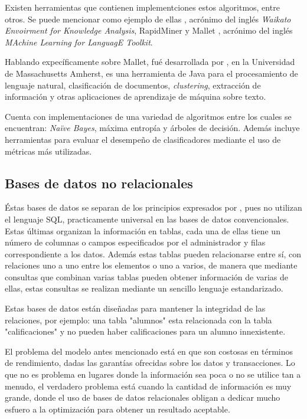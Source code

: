 Existen herramientas que contienen implementciones estos algoritmos, entre otros. Se puede mencionar como ejemplo de ellas \cite{Weka}, acrónimo del inglés \textit{Waikato Envoirment for Knowledge Analysis}, RapidMiner \cite{RapidMiner} y Mallet \cite{Mallet}, acrónimo del inglés \textit{MAchine Learning for LanguagE Toolkit}.

Hablando expecíficamente sobre Mallet, fué desarrollada por \cite{Mallet}, en la Universidad de Massachusetts Amherst, es una herramienta de Java para el procesamiento de lenguaje natural, clasificación de documentos, \textit{clustering}, extracción de información y otras aplicaciones de aprendizaje de máquina sobre texto.

Cuenta con implementaciones de una variedad de algoritmos entre los cuales se encuentran: \textit{Naïve Bayes}, máxima entropía y árboles de decisión. Además incluye herramientas para evaluar el desempeño de clasificadores mediante el uso de métricas más utilizadas.

\subsection{Bases de datos no relacionales}
\label{subsubsec:BDNoSQL}

Éstas bases de datos se separan de los principios expresados por \cite{CoddSQL}, pues no utilizan el lenguaje SQL, practicamente universal en las bases de datos convencionales. Estas últimas organizan la información en tablas, cada una de ellas tiene un número de columnas o campos especificados por el administrador y  filas correspondiente a los datos. Además estas tablas pueden relacionarse entre sí, con relaciones uno a uno entre los elementos o uno a varios, de manera que mediante consultas que combinan varias tablas pueden obtener información de varias de ellas, estas consultas se realizan mediante un sencillo lenguaje estandarizado.

Estas bases de datos están diseñadas para mantener la integridad de las relaciones, por ejemplo: una tabla "alumnos" esta relacionada con la tabla "calificaciones" y no pueden haber calificaciones para un alumno innexistente. 

El problema del modelo antes mencionado está en que son costosas en términos de rendimiento, dadas las garantías ofrecidas sobre los datos y transacciones. Lo que no es problema en lugares donde la información sea poca o no se utilice tan a menudo, el verdadero problema está cuando la cantidad de información es muy grande, donde el uso de bases de datos relacionales obligan a dedicar mucho esfuero a la optimización para obtener un resultado aceptable.

